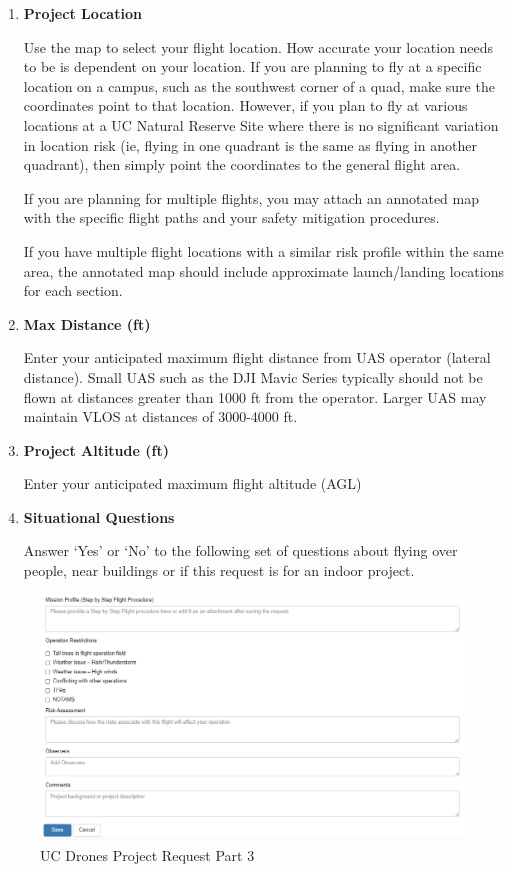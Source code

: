 \documentclass[
]{book}
\begin{document}
\begin{enumerate}
\def\labelenumi{\arabic{enumi}.}
\setcounter{enumi}{10}
\item
  \textbf{Project Location}

  Use the map to select your flight location. How accurate your location needs to be is dependent on your location. If you are planning to fly at a specific location on a campus, such as the southwest corner of a quad, make sure the coordinates point to that location. However, if you plan to fly at various locations at a UC Natural Reserve Site where there is no significant variation in location risk (ie, flying in one quadrant is the same as flying in another quadrant), then simply point the coordinates to the general flight area.

  If you are planning for multiple flights, you may attach an annotated map with the specific flight paths and your safety mitigation procedures.

  If you have multiple flight locations with a similar risk profile within the same area, the annotated map should include approximate launch/landing locations for each section.
\item
  \textbf{Max Distance (ft)}

  Enter your anticipated maximum flight distance from UAS operator (lateral distance). Small UAS such as the DJI Mavic Series typically should not be flown at distances greater than 1000 ft from the operator. Larger UAS may maintain VLOS at distances of 3000-4000 ft.
\item
  \textbf{Project Altitude (ft)}

  Enter your anticipated maximum flight altitude (AGL)
\item
  \textbf{Situational Questions}

  Answer `Yes' or `No' to the following set of questions about flying over people, near buildings or if this request is for an indoor project.
\end{enumerate}

\begin{figure}

{\centering \includegraphics[width=0.95\linewidth]{images/UCDrones_project_3} 

}

\caption{UC Drones Project Request Part 3}\label{fig:UCDrones-project-p3}
\end{figure}
\end{document}
